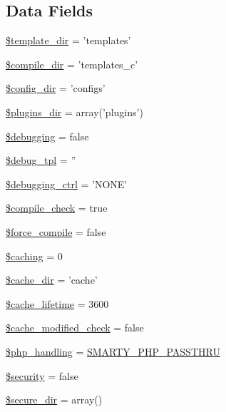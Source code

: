 \subsection*{\-Data \-Fields}
\begin{DoxyCompactItemize}
\item 
\hyperlink{class_smarty_a9677af6792fd68e3968c8b7ff44f2b36}{\$template\-\_\-dir} = 'templates'
\item 
\hyperlink{class_smarty_a43c2cf2ae254b7b9c45079b63e453c4e}{\$compile\-\_\-dir} = 'templates\-\_\-c'
\item 
\hyperlink{class_smarty_abb77b9d3df110ff462474ee0feaa7859}{\$config\-\_\-dir} = 'configs'
\item 
\hyperlink{class_smarty_a5bd94212cee8bfa32df2bd9d443f30eb}{\$plugins\-\_\-dir} = array('plugins')
\item 
\hyperlink{class_smarty_a22d995c07dbbe5b426d4fda3931cfcca}{\$debugging} = false
\item 
\hyperlink{class_smarty_adbe83b13ba657998e0fb861b44ecfd59}{\$debug\-\_\-tpl} = ''
\item 
\hyperlink{class_smarty_a9b02ae21521c28e6eeb53bd58777aa7b}{\$debugging\-\_\-ctrl} = '\-N\-O\-N\-E'
\item 
\hyperlink{class_smarty_ab9662ea355e8e7c1f47ef0e568147512}{\$compile\-\_\-check} = true
\item 
\hyperlink{class_smarty_ac956f556d1b636556e96902d4d5377ff}{\$force\-\_\-compile} = false
\item 
\hyperlink{class_smarty_aa36073c4cda5c97981a5b99ca92208be}{\$caching} = 0
\item 
\hyperlink{class_smarty_a22a35efc9ca709527d49ff8bfe76db78}{\$cache\-\_\-dir} = 'cache'
\item 
\hyperlink{class_smarty_a5aaab753f75170fa670cbb602aa97119}{\$cache\-\_\-lifetime} = 3600
\item 
\hyperlink{class_smarty_a0734d0f7c5eea130baa18c0424ab07b0}{\$cache\-\_\-modified\-\_\-check} = false
\item 
\hyperlink{class_smarty_abb37c3c6b2bcb9a527c4139bffb7e6ca}{\$php\-\_\-handling} = \hyperlink{_smarty_8class_8php_ae3b4c1abf166f5bc090b8ffd8b7b986e}{\-S\-M\-A\-R\-T\-Y\-\_\-\-P\-H\-P\-\_\-\-P\-A\-S\-S\-T\-H\-R\-U}
\item 
\hyperlink{class_smarty_a7ef3408af92597c92305e22f79e67d61}{\$security} = false
\item 
\hyperlink{class_smarty_a7694029b12fccde3ffae27a1d1d7b5be}{\$secure\-\_\-dir} = array()
\item 

\end{DoxyCompactItemize}
